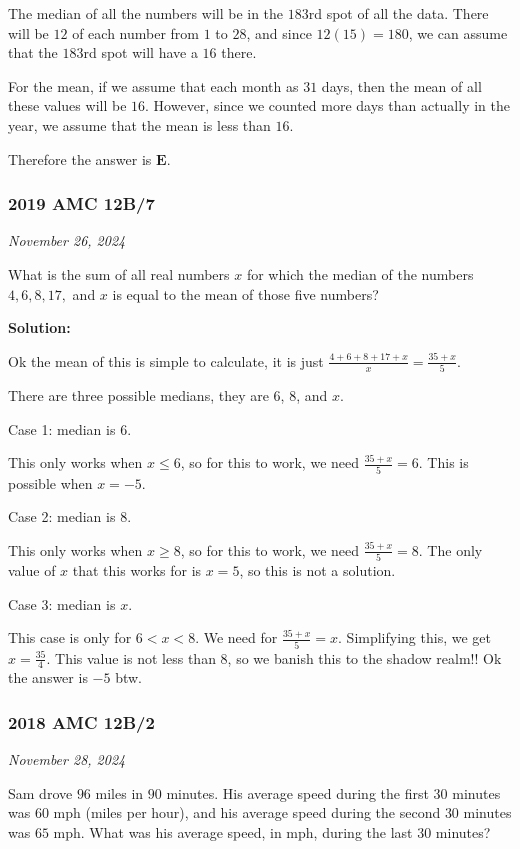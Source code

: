 \documentclass[../mathproblems.tex]{subfiles}
\begin{document}
The median of all the numbers will be in the $183$rd spot of all the data. There will be $12$ of each number from $1$ to $28$, and since $12(15) = 180$, we can assume that the $183$rd spot will have a $16$ there.

For the mean, if we assume that each month as $31$ days, then the mean of all these values will be $16$. However, since we counted more days than actually in the year, we assume that the mean is less than $16$.

Therefore the answer is $\boxed{\textbf{E}}$.

\noindent\hrulefill
\subsubsection*{2019 AMC 12B/7} 
\textit{November 26, 2024}

What is the sum of all real numbers $x$ for which the median of the numbers $4,6,8,17,$ and $x$ is equal to the mean of those five numbers?

\textbf{Solution:}

Ok the mean of this is simple to calculate, it is just $\frac{4+6+8+17+x}{x} = \frac{35+x}{5}$.

There are three possible medians, they are $6$, $8$, and $x$.

Case 1: median is $6$.

This only works when $x\leq 6$, so for this to work, we need $\frac{35+x}{5}=6$. This is possible when $x=-5$.

Case 2: median is $8$.

This only works when $x\geq 8$, so for this to work, we need $\frac{35+x}{5}=8$. The only value of $x$ that this works for is $x=5$, so this is not a solution.

Case 3: median is $x$.

This case is only for $6 <x <8$. We need for $\frac{35+x}{5}=x$. Simplifying this, we get $x=\frac{35}{4}$. This value is not less than $8$, so we banish this to the shadow realm!! Ok the answer is $\boxed{-5}$ btw.

\noindent\hrulefill
\subsubsection*{2018 AMC 12B/2} 
\textit{November 28, 2024}

Sam drove $96$ miles in $90$ minutes. His average speed during the first $30$ minutes was $60$ mph (miles per hour), and his average speed during the second $30$ minutes was $65$ mph. What was his average speed, in mph, during the last $30$ minutes?
\end{document}
